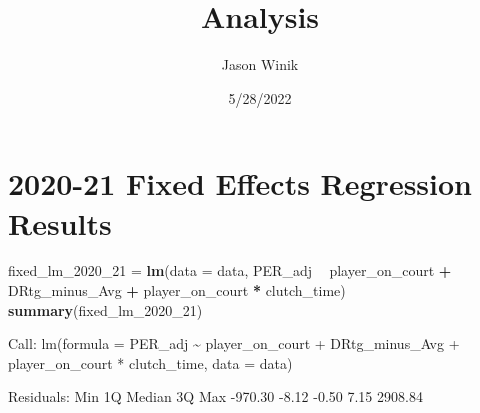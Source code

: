 \documentclass[
  landscape]{article}
\title{Analysis}
\author{Jason Winik}
\date{5/28/2022}
\newenvironment{Shaded}{\begin{snugshade}}{\end{snugshade}}
\newcommand{\DataTypeTok}[1]{\textcolor[rgb]{0.13,0.29,0.53}{#1}}
\newcommand{\DecValTok}[1]{\textcolor[rgb]{0.00,0.00,0.81}{#1}}
\newcommand{\KeywordTok}[1]{\textcolor[rgb]{0.13,0.29,0.53}{\textbf{#1}}}
\newcommand{\NormalTok}[1]{#1}
\newcommand{\OperatorTok}[1]{\textcolor[rgb]{0.81,0.36,0.00}{\textbf{#1}}}
\newcommand{\StringTok}[1]{\textcolor[rgb]{0.31,0.60,0.02}{#1}}
\begin{document}
\maketitle

\hypertarget{fixed-effects-regression-results}{%
\section{2020-21 Fixed Effects Regression
Results}\label{fixed-effects-regression-results}}

\begin{Shaded}
\begin{Highlighting}[]
\NormalTok{fixed_lm_}\DecValTok{2020}\NormalTok{_}\DecValTok{21}\NormalTok{ =}\StringTok{ }\KeywordTok{lm}\NormalTok{(}\DataTypeTok{data =}\NormalTok{ data, PER_adj }\OperatorTok{~}\StringTok{ }\NormalTok{player_on_court }\OperatorTok{+}\StringTok{ }\NormalTok{DRtg_minus_Avg }\OperatorTok{+}\StringTok{ }\NormalTok{player_on_court }\OperatorTok{*}\StringTok{ }\NormalTok{clutch_time)}
\KeywordTok{summary}\NormalTok{(fixed_lm_}\DecValTok{2020}\NormalTok{_}\DecValTok{21}\NormalTok{)}
\end{Highlighting}
\end{Shaded}

Call: lm(formula = PER\_adj \textasciitilde{} player\_on\_court +
DRtg\_minus\_Avg + player\_on\_court * clutch\_time, data = data)

Residuals: Min 1Q Median 3Q Max -970.30 -8.12 -0.50 7.15 2908.84
\end{document}
